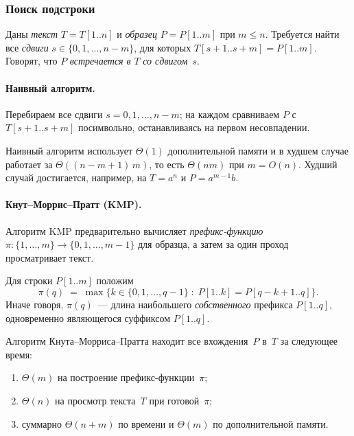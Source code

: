 \subsubsection*{Поиск подстроки}

\begin{definition}
\label{def:substring-search}
Даны \emph{текст} $T = T[1..n]$ и \emph{образец} $P = P[1..m]$ при
$m \leq n$. Требуется найти все \emph{сдвиги}
$s \in \{0, 1, \dots, n - m\}$, для которых
$T[s + 1 .. s + m] = P[1..m]$. Говорят, что $P$ \emph{встречается в}
$T$ \emph{со сдвигом~$s$}.
\end{definition}

\paragraph{Наивный алгоритм.} Перебираем все сдвиги
$s = 0, 1, \dots, n - m$; на каждом сравниваем $P$ с $T[s+1..s+m]$
посимвольно, останавливаясь на первом несовпадении.

\begin{proposition}
\label{prop:naive-search}
Наивный алгоритм использует $\Theta(1)$ дополнительной памяти и в
худшем случае работает за $\Theta((n - m + 1)\, m)$, то есть
$\Theta(nm)$ при $m = O(n)$. Худший случай достигается, например, на
$T = a^n$ и $P = a^{m-1} b$.
\end{proposition}

\paragraph{Кнут--Моррис--Пратт (KMP).} Алгоритм KMP предварительно
вычисляет \emph{префикс-функцию}
$\pi \colon \{1, \dots, m\} \to \{0, 1, \dots, m - 1\}$ для образца, а
затем за один проход просматривает текст.

\begin{definition}
\label{def:prefix-function}
Для строки $P[1..m]$ положим
\[
  \pi(q) \;=\; \max\{ k \in \{0, 1, \dots, q - 1\} \;:\; P[1..k] = P[q - k + 1 .. q] \}.
\]
Иначе говоря, $\pi(q)$~--- длина наибольшего \emph{собственного}
префикса $P[1..q]$, одновременно являющегося суффиксом $P[1..q]$.
\end{definition}

\begin{theorem}
\label{thm:kmp}
Алгоритм Кнута--Морриса--Пратта находит все вхождения~$P$ в~$T$
за следующее время:
\begin{enumerate}[label=(\alph*)]
  \item $\Theta(m)$ на построение префикс-функции~$\pi$;
  \item $\Theta(n)$ на просмотр текста~$T$ при готовой~$\pi$;
  \item суммарно $\Theta(n + m)$ по времени и $\Theta(m)$ по
        дополнительной памяти.
\end{enumerate}
\end{theorem}

